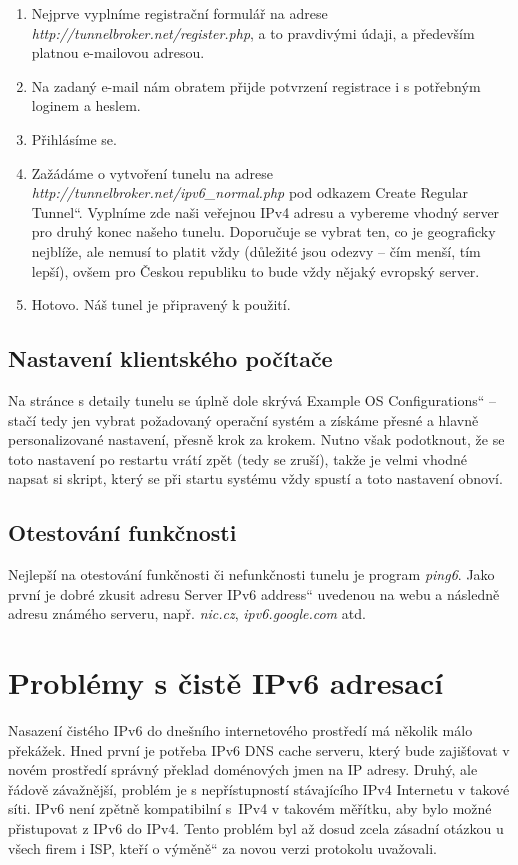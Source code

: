 \documentclass[12pt]{report}
\newcommand\uv[1]{\quotedblbase #1\textquotedblleft}
\begin{document}
\begin{enumerate}
\item Nejprve vyplníme registrační formulář na adrese \textit{http://tunnelbroker.net/register.php}, a to pravdivými údaji, a především platnou e-mailovou adresou.
\item Na zadaný e-mail nám obratem přijde potvrzení registrace i s potřebným loginem a heslem.
\item Přihlásíme se.
\item Zažádáme o vytvoření tunelu na adrese \textit{http://tunnelbroker.net/ipv6\_normal.php} pod odkazem \uv{Create Regular Tunnel}. Vyplníme zde naši veřejnou IPv4 adresu a vybereme vhodný server pro druhý konec našeho tunelu. Doporučuje se vybrat ten, co je geograficky nejblíže, ale nemusí to platit vždy (důležité jsou odezvy -- čím menší, tím lepší), ovšem pro Českou republiku to bude vždy nějaký evropský server.
\item Hotovo. Náš tunel je připravený k použití.
\end{enumerate}

\subsection{Nastavení klientského počítače}
Na stránce s detaily tunelu se úplně dole skrývá \uv{Example OS Configurations} -- stačí tedy jen vybrat požadovaný operační systém a získáme přesné a hlavně personalizované nastavení, přesně krok za krokem. Nutno však podotknout, že se toto nastavení po restartu vrátí zpět (tedy se zruší), takže je velmi vhodné napsat si skript, který se při startu systému vždy spustí a toto nastavení obnoví.

\subsection{Otestování funkčnosti}
Nejlepší na otestování funkčnosti či nefunkčnosti tunelu je program \textit{ping6}. Jako první je dobré zkusit adresu \uv{Server IPv6 address} uvedenou na webu a následně adresu známého serveru, např. \textit{nic.cz}, \textit{ipv6.google.com} atd.

\section{Problémy s čistě IPv6 adresací}
Nasazení čistého IPv6 do dnešního internetového prostředí má několik málo překážek. Hned první je potřeba IPv6 DNS cache serveru, který bude zajišťovat v novém prostředí správný překlad doménových jmen na IP adresy. Druhý, ale řádově závažnější, problém je s nepřístupností stávajícího IPv4 Internetu v takové síti. IPv6 není zpětně kompatibilní s~IPv4 v takovém měřítku, aby bylo možné přistupovat z IPv6 do IPv4. Tento problém byl až dosud zcela zásadní otázkou u všech firem i ISP, kteří o \uv{výměně} za novou verzi protokolu uvažovali.
\end{document}
